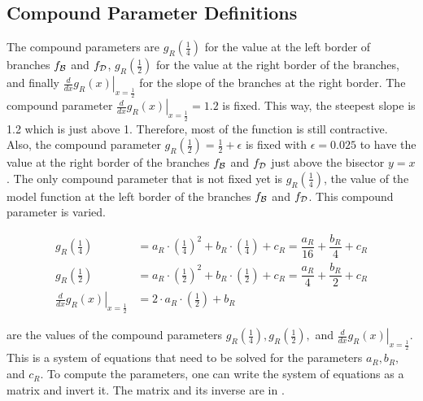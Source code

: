 \subsection{Compound Parameter Definitions}
\label{sec:setup.quad.hyper.params}

The compound parameters are $g_R\left(\frac{1}{4}\right)$ for the value at the left border of branches $f_{\mathcal{B}}$ and $f_{\mathcal{D}}$, $g_R\left(\frac{1}{2}\right)$ for the value at the right border of the branches, and finally $\left. \frac{d}{dx} g_R(x) \right|_{x = \frac{1}{2}}$ for the slope of the branches at the right border.
The compound parameter $\left. \frac{d}{dx} g_R(x) \right|_{x = \frac{1}{2}} = 1.2$ is fixed.
This way, the steepest slope is 1.2 which is just above 1.
Therefore, most of the function is still contractive.
Also, the compound parameter $g_R\left(\frac{1}{2}\right) = \frac{1}{2} + \epsilon$ is fixed with $\epsilon = 0.025$ to have the value at the right border of the branches $f_{\mathcal{B}}$ and $f_{\mathcal{D}}$ just above the bisector $y = x$.
The only compound parameter that is not fixed yet is $g_R\left(\frac{1}{4}\right)$, the value of the model function at the left border of the branches $f_{\mathcal{B}}$ and $f_{\mathcal{D}}$.
This compound parameter is varied.

\begin{subequations}
	\begin{align}
		g_R\left(\frac{1}{4}\right)                                     & = a_R \cdot \left(\frac{1}{4}\right)^2 + b_R \cdot \left(\frac{1}{4}\right) + c_R = \dfrac{a_R}{16} + \dfrac{b_R}{4} + c_R \label{equ:setup.quad.hyper.A} \\
		g_R\left(\frac{1}{2}\right)                                     & = a_R \cdot \left(\frac{1}{2}\right)^2 + b_R \cdot \left(\frac{1}{2}\right) + c_R = \dfrac{a_R}{4} + \dfrac{b_R}{2} + c_R \label{equ:setup.quad.hyper.B}  \\
		\left. \frac{d}{dx} g_R\left(x\right) \right|_{x = \frac{1}{2}} & = 2 \cdot a_R \cdot \left(\frac{1}{2}\right) + b_R \label{equ:setup.quad.hyper.C}
	\end{align}
\end{subequations}

 are the values of the compound parameters $g_R\left(\frac{1}{4}\right), g_R\left(\frac{1}{2}\right),$ and $\left. \frac{d}{dx} g_R\left(x\right) \right|_{x = \frac{1}{2}}$.
This is a system of equations that need to be solved for the parameters $a_R, b_R,$ and $c_R$.
To compute the parameters, one can write the system of equations as a matrix and invert it.
The matrix and its inverse are in .

